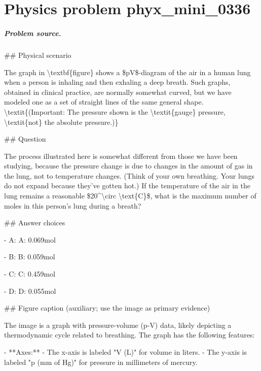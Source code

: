
\chapter{Physics problem phyx\_mini\_0336}
\label{ch:PhyXMiniProblems_problem_phyx_mini_0336}

\paragraph{Problem source.}
\#\# Physical scenario

The graph in \textbackslash{}textbf\{figure\} shows a \$pV\$-diagram of the air in a human lung when a person is inhaling and then exhaling a deep breath. Such graphs, obtained in clinical practice, are normally somewhat curved, but we have modeled one as a set of straight lines of the same general shape. \textbackslash{}textit\{(Important: The pressure shown is the \textbackslash{}textit\{gauge\} pressure, \textbackslash{}textit\{not\} the absolute pressure.)\}

\#\# Question

The process illustrated here is somewhat different from those we have been studying, because the pressure change is due to changes in the amount of gas in the lung, not to temperature changes. (Think of your own breathing. Your lungs do not expand because they’ve gotten hot.) If the temperature of the air in the lung remains a reasonable \$20\textasciicircum{}\textbackslash{}circ \textbackslash{}text\{C\}\$, what is the maximum number of moles in this person’s lung during a breath?

\#\# Answer choices

- A: A: 0.069mol

- B: B: 0.059mol

- C: C: 0.459mol

- D: D: 0.055mol

\#\# Figure caption (auxiliary; use the image as primary evidence)

The image is a graph with pressure-volume (p-V) data, likely depicting a thermodynamic cycle related to breathing. The graph has the following features:

- **Axes:** 
  - The x-axis is labeled "V (L)" for volume in liters.
  - The y-axis is labeled "p (mm of Hg)" for pressure in millimeters of mercury.

